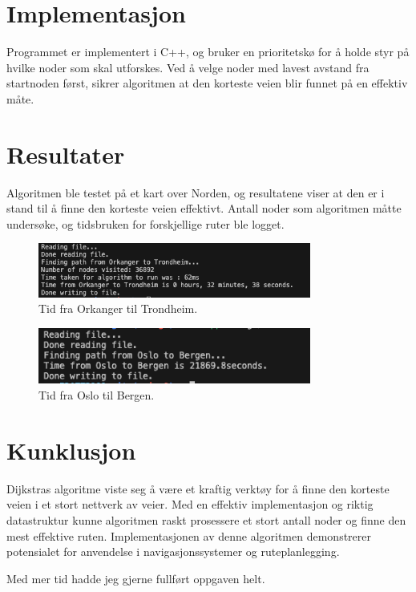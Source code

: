 \documentclass[12pt,a4paper]{article}
\begin{document}
\section{Implementasjon}
Programmet er implementert i C++, og bruker en prioritetskø for å holde styr på hvilke noder som skal utforskes. Ved å velge noder med lavest avstand fra startnoden først, sikrer algoritmen at den korteste veien blir funnet på en effektiv måte.

\section{Resultater}
Algoritmen ble testet på et kart over Norden, og resultatene viser at den er i stand til å finne den korteste veien effektivt. Antall noder som algoritmen måtte undersøke, og tidsbruken for forskjellige ruter ble logget.

\begin{figure}[h]
    \centering
    \includegraphics[width=0.8\textwidth]{resultat2.png}
    \caption{Tid fra Orkanger til Trondheim.}
\end{figure}

\begin{figure}[h]
    \centering
    \includegraphics[width=0.8\textwidth]{resultat.png}
    \caption{Tid fra Oslo til Bergen.}
\end{figure}

\section{Kunklusjon}
Dijkstras algoritme viste seg å være et kraftig verktøy for å finne den korteste veien i et stort nettverk av veier. Med en effektiv implementasjon og riktig datastruktur kunne algoritmen raskt prosessere et stort antall noder og finne den mest effektive ruten. Implementasjonen av denne algoritmen demonstrerer potensialet for anvendelse i navigasjonssystemer og ruteplanlegging.

Med mer tid hadde jeg gjerne fullført oppgaven helt.
\end{document}
